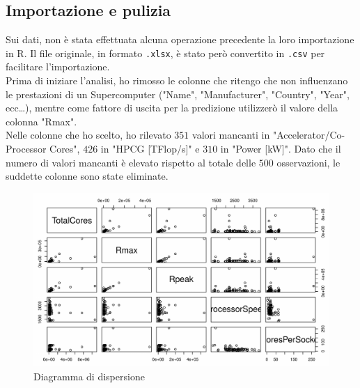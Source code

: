 \documentclass[11pt,a4paper]{article}
\begin{document}
\subsection{Importazione e pulizia}
Sui dati, non \`e stata effettuata alcuna operazione precedente la loro
importazione in R. Il file originale, in formato \texttt{.xlsx}, \`e stato
per\`o convertito in \texttt{.csv} per facilitare l'importazione.\\
Prima di iniziare l'analisi, ho rimosso le colonne che ritengo che non
influenzano le prestazioni di un Supercomputer ("Name", "Manufacturer",
"Country", "Year", ecc\dots), mentre come fattore di
uscita per la predizione utilizzer\`o il valore della colonna "Rmax".\\
Nelle colonne che ho scelto, ho rilevato $351$ valori mancanti in
"Accelerator/Co-Processor Cores", $426$ in "HPCG [TFlop/s]" e $310$ in
"Power [kW]". Dato che il numero di valori mancanti \`e elevato rispetto al
totale delle $500$ osservazioni, le suddette colonne sono state eliminate.
\begin{figure}
	\vspace{-0.6cm}
	\centering
	\includegraphics[scale=0.72]{imgs/plot(data).pdf}
	\vspace{-0.4cm}
	\caption{Diagramma di dispersione}
\end{figure}
\clearpage
\end{document}
